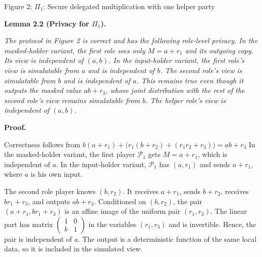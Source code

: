 Figure 2: $\Pi_{1}$: Secure delegated multiplication with one helper party




\par\medskip\noindent\textbf{
\textbf{Lemma 2.2}\textbf{ }(Privacy for $\Pi_{1}$)\textbf{.}
}\par



\emph{The protocol in Figure 2 is correct and has the following role-level privacy. In the masked-holder variant, the first role sees only $M=a+r_{1}$ and its outgoing copy. Its view is independent of $(a,b)$. In the input-holder variant, the first role’s view is simulatable from $a$ and is independent of $b$. The second role’s view is simulatable from $b$ and is independent of $a$. This remains true even though it outputs the masked value $ab+r_{3}$, whose joint distribution with the rest of the second role’s view remains simulatable from $b$. The helper role’s view is independent of $(a,b)$.}\par






\par\medskip\noindent\textbf{Proof.}\par




Correctness follows from
$b(a+r_{1})+\bigl(r_{1}(b+r_{2})+(r_{1}r_{2}+r_{3})\bigr)=ab+r_{3}$
In the masked-holder variant, the first player $\mathcal{P}_{1}$ gets $M=a+r_{1}$, which is independent of $a$.
In the input-holder variant, $\mathcal{P}_{1}$ has $(a,r_{1})$ and sends $a+r_{1}$, where $a$ is his own input.\par




The second role player knows $(b,r_{2})$. It receives $a+r_{1}$, sends $b+r_{2}$, receives $br_{1}+r_{3}$, and outputs $ab+r_{3}$. Conditioned on $(b,r_{2})$, the pair $(a+r_{1},br_{1}+r_{3})$ is an affine image of the uniform pair $(r_{1},r_{3})$. The linear part has matrix $\begin{pmatrix}1&0\\
b&1\end{pmatrix}$ in the variables $(r_{1},r_{3})$ and is invertible. Hence, the pair is independent of $a$. The output is a deterministic function of the same local data, so it is included in the simulated view.\par




